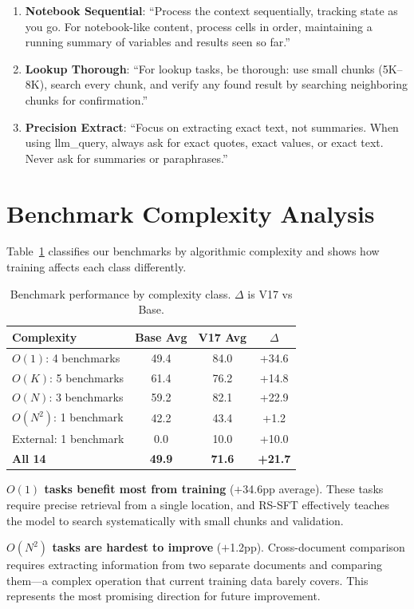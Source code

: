 \documentclass{article}
\begin{document}
\begin{enumerate}
    \item \textbf{Notebook Sequential}: ``Process the context sequentially, tracking state as you go. For notebook-like content, process cells in order, maintaining a running summary of variables and results seen so far.''

    \item \textbf{Lookup Thorough}: ``For lookup tasks, be thorough: use small chunks (5K--8K), search every chunk, and verify any found result by searching neighboring chunks for confirmation.''

    \item \textbf{Precision Extract}: ``Focus on extracting exact text, not summaries. When using llm\_query, always ask for exact quotes, exact values, or exact text. Never ask for summaries or paraphrases.''
\end{enumerate}

\section{Benchmark Complexity Analysis}
\label{app:complexity}

Table~\ref{tab:complexity} classifies our benchmarks by algorithmic complexity and shows how training affects each class differently.

\begin{table}[t]
\caption{Benchmark performance by complexity class. $\Delta$ is V17 vs Base.}
\label{tab:complexity}
\vskip 0.15in
\begin{center}
\begin{small}
\begin{tabular}{lccc}
\toprule
Complexity & Base Avg & V17 Avg & $\Delta$ \\
\midrule
$O(1)$: 4 benchmarks & 49.4 & 84.0 & +34.6 \\
$O(K)$: 5 benchmarks & 61.4 & 76.2 & +14.8 \\
$O(N)$: 3 benchmarks & 59.2 & 82.1 & +22.9 \\
$O(N^2)$: 1 benchmark & 42.2 & 43.4 & +1.2 \\
External: 1 benchmark & 0.0 & 10.0 & +10.0 \\
\midrule
\textbf{All 14} & \textbf{49.9} & \textbf{71.6} & \textbf{+21.7} \\
\bottomrule
\end{tabular}
\end{small}
\end{center}
\vskip -0.15in
\end{table}

\textbf{$O(1)$ tasks benefit most from training} ($+$34.6pp average). These tasks require precise retrieval from a single location, and RS-SFT effectively teaches the model to search systematically with small chunks and validation.

\textbf{$O(N^2)$ tasks are hardest to improve} ($+$1.2pp). Cross-document comparison requires extracting information from two separate documents and comparing them---a complex operation that current training data barely covers. This represents the most promising direction for future improvement.



\end{document}
